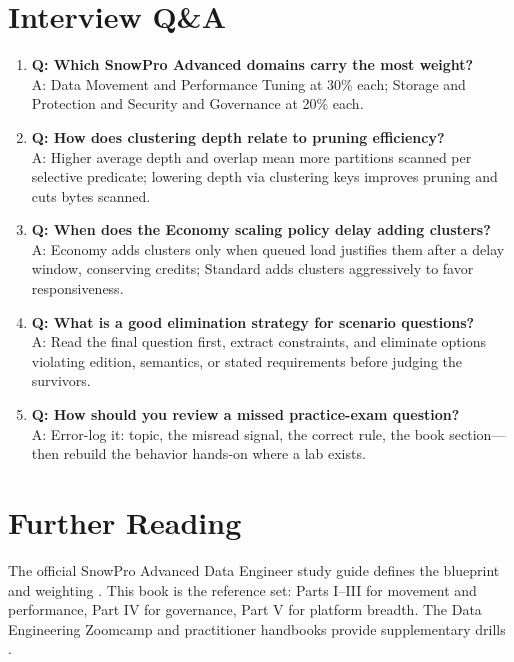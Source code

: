 \section{Interview Q\&A}
\begin{enumerate}
    \item \textbf{Q: Which SnowPro Advanced domains carry the most weight?}\\
    A: Data Movement and Performance Tuning at 30\% each; Storage and Protection and Security and Governance at 20\% each.
    \item \textbf{Q: How does clustering depth relate to pruning efficiency?}\\
    A: Higher average depth and overlap mean more partitions scanned per selective predicate; lowering depth via clustering keys improves pruning and cuts bytes scanned.
    \item \textbf{Q: When does the Economy scaling policy delay adding clusters?}\\
    A: Economy adds clusters only when queued load justifies them after a delay window, conserving credits; Standard adds clusters aggressively to favor responsiveness.
    \item \textbf{Q: What is a good elimination strategy for scenario questions?}\\
    A: Read the final question first, extract constraints, and eliminate options violating edition, semantics, or stated requirements before judging the survivors.
    \item \textbf{Q: How should you review a missed practice-exam question?}\\
    A: Error-log it: topic, the misread signal, the correct rule, the book section---then rebuild the behavior hands-on where a lab exists.
\end{enumerate}

\section{Further Reading}
The official SnowPro Advanced Data Engineer study guide defines the blueprint and weighting \cite{snowproExamGuide}. This book is the reference set: Parts I--III for movement and performance, Part IV for governance, Part V for platform breadth. The Data Engineering Zoomcamp and practitioner handbooks provide supplementary drills \cite{kafkaDocs}.

